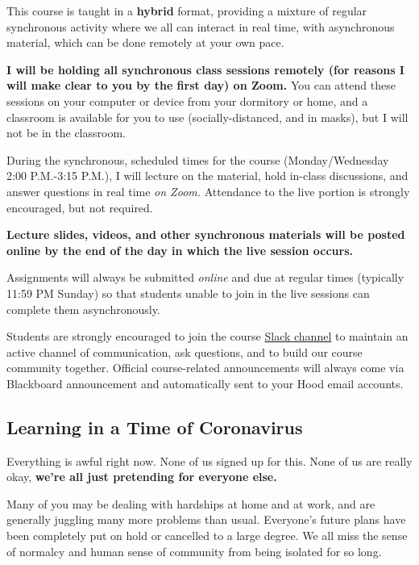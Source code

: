 \documentclass{article}
\begin{document}
This course is taught in a \textbf{hybrid} format, providing a mixture
of regular synchronous activity where we all can interact in real time,
with asynchronous material, which can be done remotely at your own pace.

\textbf{I will be holding all synchronous class sessions remotely (for
reasons I will make clear to you by the first day) on Zoom.} You can
attend these sessions on your computer or device from your dormitory or
home, and a classroom is available for you to use (socially-distanced,
and in masks), but I will not be in the classroom.

During the synchronous, scheduled times for the course (Monday/Wednesday
2:00 P.M.-3:15 P.M.), I will lecture on the material, hold in-class
discussions, and answer questions in real time \emph{on Zoom.}
Attendance to the live portion is strongly encouraged, but not required.

\textbf{Lecture slides, videos, and other synchronous materials will be
posted online by the end of the day in which the live session occurs.}

Assignments will always be submitted \emph{online} and due at regular
times (typically 11:59 PM Sunday) so that students unable to join in the
live sessions can complete them asynchronously.

Students are strongly encouraged to join the course
\href{https://hoodcollegeeconomics.slack.com}{Slack channel} to maintain
an active channel of communication, ask questions, and to build our
course community together. Official course-related announcements will
always come via Blackboard announcement and automatically sent to your
Hood email accounts.

\hypertarget{learning-in-a-time-of-coronavirus}{%
\subsection*{Learning in a Time of
Coronavirus}\label{learning-in-a-time-of-coronavirus}}

Everything is awful right now. None of us signed up for this. None of us
are really okay, \textbf{we're all just pretending for everyone else.}

Many of you may be dealing with hardships at home and at work, and are
generally juggling many more problems than usual. Everyone's future
plans have been completely put on hold or cancelled to a large degree.
We all miss the sense of normalcy and human sense of community from
being isolated for so long.
\end{document}
